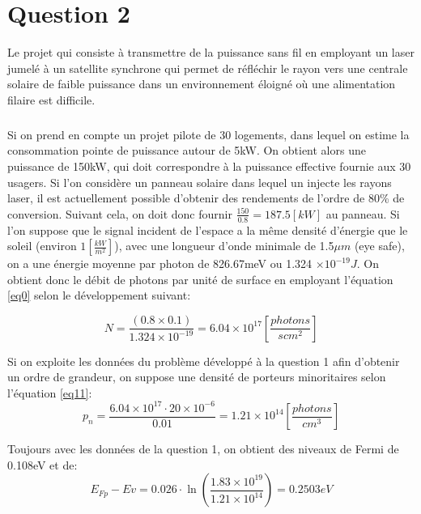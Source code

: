 \chapter*{Question 2}

Le projet qui consiste à transmettre de la puissance sans fil en employant un laser jumelé à un satellite synchrone qui permet de réfléchir le rayon vers une centrale solaire de faible puissance dans un environnement éloigné où une alimentation filaire est difficile. 

\paragraph{}Si on prend en compte un projet pilote de 30 logements, dans lequel on estime la consommation pointe de puissance autour de 5kW. On obtient alors une puissance de 150kW, qui doit correspondre à la puissance effective fournie aux 30 usagers. Si l'on considère un panneau solaire dans lequel un injecte les rayons laser, il est actuellement possible d'obtenir des rendements de l'ordre de 80\% de conversion. Suivant cela, on doit donc fournir $\frac{150}{0.8} = 187.5 \left[kW\right]$ au panneau. Si l'on suppose que le signal incident de l'espace a la même densité d'énergie que le soleil (environ $1\left[\frac{kW}{m^2}\right]$), avec une longueur d'onde minimale de 1.5$\mu m$ (eye safe), on a une énergie moyenne par photon de 826.67meV ou 1.324 $\times 10^{-19} J$. On obtient donc le débit de photons par unité de surface en employant l'équation \ref{eq0} selon le développement suivant:

\begin{equation}
N = \frac{(0.8 \times 0.1)}{1.324\times 10^{-19}} = 6.04\times 10^{17} \left[\frac{photons}{s cm^2}\right]
\end{equation}

Si on exploite les données du problème développé à la question 1 afin d'obtenir un ordre de grandeur, on suppose une densité de porteurs minoritaires selon l'équation \ref{eq11}:
\begin{equation}
p_n = \frac{6.04\times 10^{17} \cdot 20 \times 10^{-6}}{0.01} = 1.21\times 10^{14}\left[\frac{photons}{cm^3}\right]
\end{equation}

Toujours avec les données de la question 1, on obtient des niveaux de Fermi de 0.108eV et de:
\begin{equation}
E_{Fp} - Ev = 0.026\cdot\ln\left(\frac{1.83\times 10^{19}}{1.21\times 10^{14}}\right) = 0.2503eV
\end{equation}

